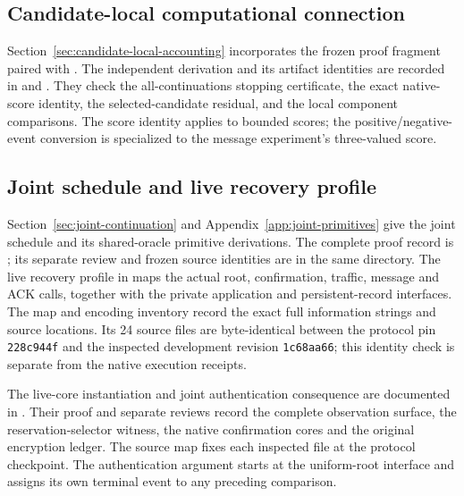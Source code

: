 \documentclass[pdflatex]{sn-jnl}
\theoremstyle{thmstyleone}
\theoremstyle{thmstylethree}
\theoremstyle{thmstyletwo}
\newcommand{\sourcecommit}{\texttt{228c944f}}
\begin{document}
\subsection{Candidate-local computational connection}

Section~\ref{sec:candidate-local-accounting} incorporates the frozen proof
fragment paired with .
The independent derivation and its artifact identities are
recorded in  and
. They check the
all-continuations stopping certificate, the exact native-score identity,
the selected-candidate residual, and the local component comparisons.
The score identity applies to bounded scores; the positive/negative-event
conversion is specialized to the message experiment's three-valued score.

\subsection{Joint schedule and live recovery profile}
\label{app:joint-artifacts}

Section~\ref{sec:joint-continuation} and Appendix~\ref{app:joint-primitives}
give the joint schedule and its shared-oracle primitive derivations.
The complete proof record is
; its separate
review and frozen source identities are in the same directory.
The live recovery profile in 
maps the actual root, confirmation, traffic, message and ACK calls, together
with the private application and persistent-record interfaces. The map and
encoding inventory record the exact full information strings and source
locations. Its 24 source files are byte-identical between the protocol pin
\sourcecommit{} and the inspected development revision
\texttt{1c68aa66}; this identity check is separate from the native
execution receipts.

The live-core instantiation and joint authentication consequence are documented
in . Their proof and separate reviews
record the complete observation surface, the reservation-selector witness,
the native confirmation cores and the original encryption ledger. The source
map fixes each inspected file at the protocol checkpoint. The authentication
argument starts at the uniform-root interface and assigns its own terminal
event to any preceding comparison.
\end{document}
